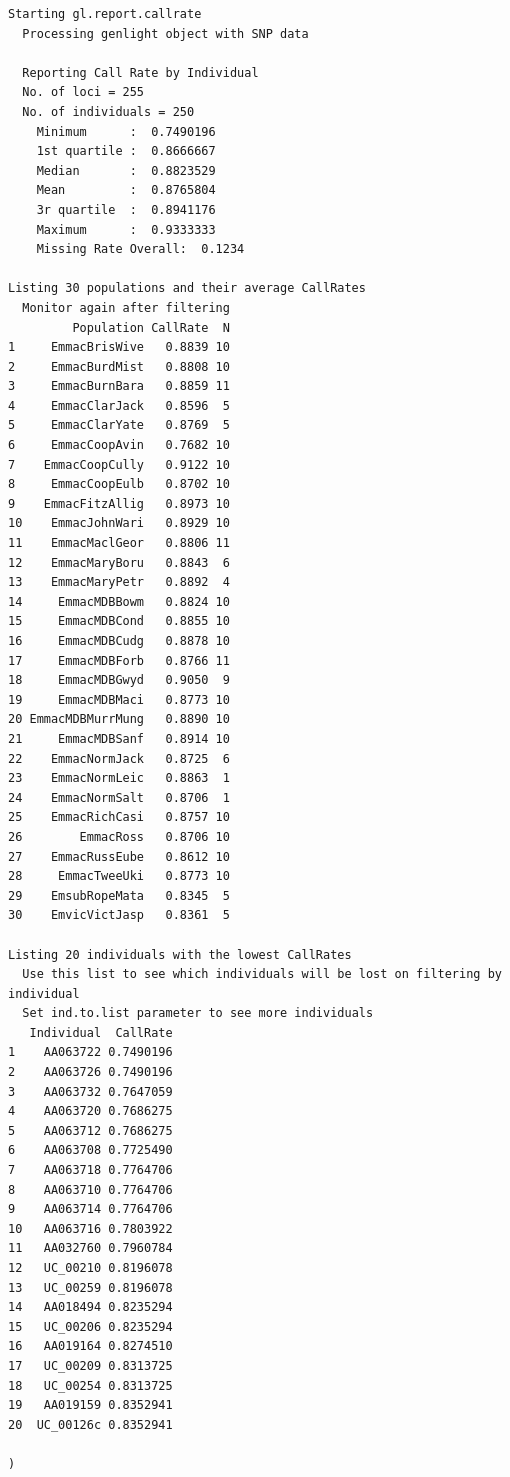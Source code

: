 \documentclass[
  letterpaper,
  DIV=11,
  numbers=noendperiod]{scrreprt}
\let\textttOrig\texttt
\renewcommand{\texttt}[1]{\textttOrig{\color{blue}{#1}}}
\begin{document}
\begin{verbatim}
Starting gl.report.callrate 
  Processing genlight object with SNP data

  Reporting Call Rate by Individual
  No. of loci = 255 
  No. of individuals = 250 
    Minimum      :  0.7490196 
    1st quartile :  0.8666667 
    Median       :  0.8823529 
    Mean         :  0.8765804 
    3r quartile  :  0.8941176 
    Maximum      :  0.9333333 
    Missing Rate Overall:  0.1234 

Listing 30 populations and their average CallRates
  Monitor again after filtering
         Population CallRate  N
1     EmmacBrisWive   0.8839 10
2     EmmacBurdMist   0.8808 10
3     EmmacBurnBara   0.8859 11
4     EmmacClarJack   0.8596  5
5     EmmacClarYate   0.8769  5
6     EmmacCoopAvin   0.7682 10
7    EmmacCoopCully   0.9122 10
8     EmmacCoopEulb   0.8702 10
9    EmmacFitzAllig   0.8973 10
10    EmmacJohnWari   0.8929 10
11    EmmacMaclGeor   0.8806 11
12    EmmacMaryBoru   0.8843  6
13    EmmacMaryPetr   0.8892  4
14     EmmacMDBBowm   0.8824 10
15     EmmacMDBCond   0.8855 10
16     EmmacMDBCudg   0.8878 10
17     EmmacMDBForb   0.8766 11
18     EmmacMDBGwyd   0.9050  9
19     EmmacMDBMaci   0.8773 10
20 EmmacMDBMurrMung   0.8890 10
21     EmmacMDBSanf   0.8914 10
22    EmmacNormJack   0.8725  6
23    EmmacNormLeic   0.8863  1
24    EmmacNormSalt   0.8706  1
25    EmmacRichCasi   0.8757 10
26        EmmacRoss   0.8706 10
27    EmmacRussEube   0.8612 10
28     EmmacTweeUki   0.8773 10
29    EmsubRopeMata   0.8345  5
30    EmvicVictJasp   0.8361  5

Listing 20 individuals with the lowest CallRates
  Use this list to see which individuals will be lost on filtering by individual
  Set ind.to.list parameter to see more individuals
   Individual  CallRate
1    AA063722 0.7490196
2    AA063726 0.7490196
3    AA063732 0.7647059
4    AA063720 0.7686275
5    AA063712 0.7686275
6    AA063708 0.7725490
7    AA063718 0.7764706
8    AA063710 0.7764706
9    AA063714 0.7764706
10   AA063716 0.7803922
11   AA032760 0.7960784
12   UC_00210 0.8196078
13   UC_00259 0.8196078
14   AA018494 0.8235294
15   UC_00206 0.8235294
16   AA019164 0.8274510
17   UC_00209 0.8313725
18   UC_00254 0.8313725
19   AA019159 0.8352941
20  UC_00126c 0.8352941

)
\end{verbatim}

\begin{figure}[H]

{\centering \texttt{[image: basicfiltering\_files/figure-pdf/unnamed-chunk-8-1.pdf]}

}

\end{figure}
\end{document}
